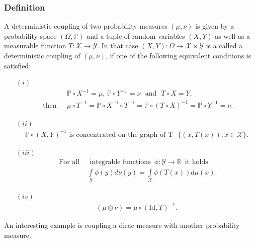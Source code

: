 \documentclass[11pt,a4paper]{article}
\begin{document}
\subsubsection{Definition}
A deterministic coupling of two probability measures $(\mu,\nu)$ is given by a probability space $(\Omega,\mathbb{P})$ and a tuple of random variables $(X,Y)$ as well as a measurable function $T:\mathcal{X}\rightarrow\mathcal{Y}.$ In that case $(X,Y):\Omega\rightarrow\mathcal{X\times{}Y}$ is a called a deterministic coupling of $(\mu,\nu)$, if one of the following equivalent conditions is satisfied: 
\begin{itemize}
\item[$(i)$]\begin{align*}
&\mathbb{P}\circ{}X^{-1}=\mu,\,\mathbb{P}\circ{}Y^{-1}=\nu\,\,\text{ and }\,\, T\circ{}X=Y,\\\text{ then }\,\,&\mu\circ{}T^{-1}=\mathbb{P}\circ{}X^{-1}\circ{}T^{-1}=\mathbb{P}\circ{}(T\circ{}X)^{-1}=\mathbb{P}\circ{}Y^{-1}=\nu. 
\end{align*}
\item[$(ii)$]\begin{align*}
\mathbb{P}\circ{}(X,Y)^{-1} \text{ is concentrated on the graph of T }\,\, \lbrace (x,T(x)); x\in\mathcal{X}\rbrace. 
\end{align*}
\item[$(iii)$]\begin{align*}
\text{ For all } & \text{ integrable  functions }\, \phi:\mathcal{Y}\rightarrow\mathbb{R}\, \text{ it holds }\\&
\int\limits_{\mathcal{Y}}\phi(y)d\nu(y) = \int\limits_{\mathcal{X}}\phi(T(x))d\mu(x).
\end{align*}
\item[$(iv)$]\begin{align*}
(\mu\otimes\nu)=\mu\circ{}(\text{Id},T)^{-1}.
\end{align*}
\end{itemize}
An interesting example is coupling a dirac measure with another probability measure.
\end{document}
